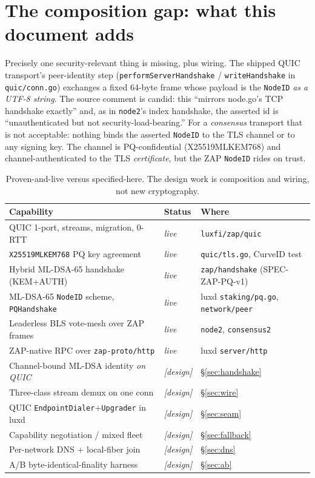 \documentclass[11pt,a4paper]{article}
\newcommand{\code}[1]{\texttt{#1}}
\begin{document}
\section{The composition gap: what this document adds}\label{sec:gap}

Precisely one security-relevant thing is missing, plus wiring. The
shipped QUIC transport's peer-identity step
(\code{performServerHandshake} / \code{writeHandshake} in
\code{quic/conn.go}) exchanges a fixed 64-byte frame whose payload is the
\code{NodeID} \emph{as a UTF-8 string}. The source comment is candid:
this ``mirrors node.go's TCP handshake exactly'' and, as in \code{node2}'s
index handshake, the asserted id is ``unauthenticated but not
security-load-bearing.'' For a \emph{consensus} transport that is not
acceptable: nothing binds the asserted \code{NodeID} to the TLS channel
or to any signing key. The channel is PQ-confidential (X25519MLKEM768)
and channel-authenticated to the TLS \emph{certificate}, but the ZAP
\code{NodeID} rides on trust.

\begin{table}[h]\centering\small
\begin{tabular}{@{}p{}p{}p{}@{}}
\toprule
\textbf{Capability} & \textbf{Status} & \textbf{Where} \\
\midrule
QUIC 1-port, streams, migration, 0-RTT & \emph{live} & \code{luxfi/zap/quic} \\
\code{X25519MLKEM768} PQ key agreement & \emph{live} & \code{quic/tls.go}, CurveID test \\
Hybrid ML-DSA-65 handshake (KEM+AUTH) & \emph{live} & \code{zap/handshake} (SPEC-ZAP-PQ-v1) \\
ML-DSA-65 \code{NodeID} scheme, \code{PQHandshake} & \emph{live} & luxd \code{staking/pq.go}, \code{network/peer} \\
Leaderless BLS vote-mesh over ZAP frames & \emph{live} & \code{node2}, \code{consensus2} \\
ZAP-native RPC over \code{zap-proto/http} & \emph{live} & luxd \code{server/http} \\
\midrule
Channel-bound ML-DSA identity \emph{on QUIC} & \emph{[design]} & \S\ref{sec:handshake} \\
Three-class stream demux on one conn & \emph{[design]} & \S\ref{sec:wire} \\
QUIC \code{EndpointDialer}+\code{Upgrader} in luxd & \emph{[design]} & \S\ref{sec:seam} \\
Capability negotiation / mixed fleet & \emph{[design]} & \S\ref{sec:fallback} \\
Per-network DNS + local-fiber join & \emph{[design]} & \S\ref{sec:dns} \\
A/B byte-identical-finality harness & \emph{[design]} & \S\ref{sec:ab} \\
\bottomrule
\end{tabular}
\caption{Proven-and-live versus specified-here. The design work is
composition and wiring, not new cryptography.}
\end{table}
\end{document}
